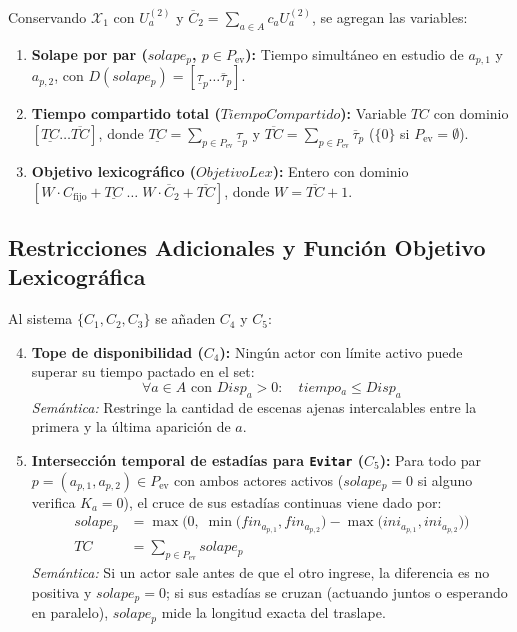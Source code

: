 Conservando $\mathcal{X}_1$ con $U^{(2)}_a$ y $\overline{C}_2 = \sum_{a \in A} c_a U^{(2)}_a$, se agregan las variables:
\begin{enumerate}
    \item \textbf{Solape por par ($solape_p$, $p \in P_{\text{ev}}$):} Tiempo simultáneo en estudio de $a_{p,1}$ y $a_{p,2}$, con $D(solape_p) = [\underline{\tau}_p \dots \overline{\tau}_p]$.
    \item \textbf{Tiempo compartido total ($TiempoCompartido$):} Variable $TC$ con dominio $[\underline{TC} \dots \overline{TC}]$, donde $\underline{TC} = \sum_{p \in P_{\text{ev}}} \underline{\tau}_p$ y $\overline{TC} = \sum_{p \in P_{\text{ev}}} \overline{\tau}_p$ ($\{0\}$ si $P_{\text{ev}} = \emptyset$).
    \item \textbf{Objetivo lexicográfico ($ObjetivoLex$):} Entero con dominio $[W \cdot C_{\text{fijo}} + \underline{TC} \;\dots\; W \cdot \overline{C}_2 + \overline{TC}]$, donde $W = \overline{TC} + 1$.
\end{enumerate}

\subsection{Restricciones Adicionales y Función Objetivo Lexicográfica}

Al sistema $\{C_1, C_2, C_3\}$ se añaden $C_4$ y $C_5$:
\begin{enumerate}
    \setcounter{enumi}{3}
    \item \textbf{Tope de disponibilidad ($C_4$):} Ningún actor con límite activo puede superar su tiempo pactado en el set:
    \begin{equation}
        \forall a \in A \text{ con } Disp_a > 0: \quad tiempo_a \le Disp_a
        \label{eq:c4_disp}
    \end{equation}
    \emph{Semántica:} Restringe la cantidad de escenas ajenas intercalables entre la primera y la última aparición de $a$.

    \item \textbf{Intersección temporal de estadías para \texttt{Evitar} ($C_5$):} Para todo par $p = (a_{p,1}, a_{p,2}) \in P_{\text{ev}}$ con ambos actores activos ($solape_p = 0$ si alguno verifica $K_a = 0$), el cruce de sus estadías continuas viene dado por:
    \begin{align}
        solape_p &= \max\Big(0,\; \min\big(fin_{a_{p,1}}, fin_{a_{p,2}}\big) - \max\big(ini_{a_{p,1}}, ini_{a_{p,2}}\big)\Big) \label{eq:c5_evitar} \\
        TC &= \sum_{p \in P_{\text{ev}}} solape_p \label{eq:tc_suma}
    \end{align}
    \emph{Semántica:} Si un actor sale antes de que el otro ingrese, la diferencia es no positiva y $solape_p = 0$; si sus estadías se cruzan (actuando juntos o esperando en paralelo), $solape_p$ mide la longitud exacta del traslape.
\end{enumerate}

